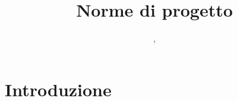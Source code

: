 


\author{\GG, \MM}
\supervisor{\LB, \AZ}
\dest{\ALL}
\title{Norme di progetto}




\maketitle

\tableofcontents
\newpage




\section{Introduzione}

